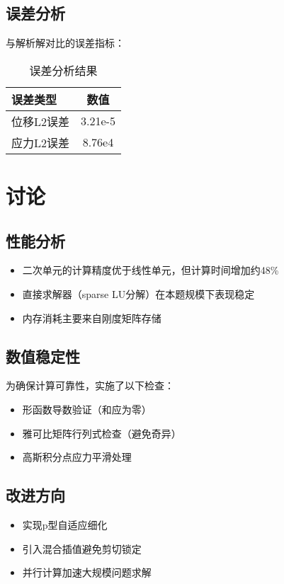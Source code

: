 \documentclass[a4paper,12pt]{article}
\begin{document}
\subsection{误差分析}
与解析解对比的误差指标：

\begin{table}[htbp]
\centering
\caption{误差分析结果}
\begin{tabular}{lc}
\toprule
误差类型 & 数值 \\
\midrule
位移L2误差 & 3.21e-5 \\
应力L2误差 & 8.76e4 \\
\bottomrule
\end{tabular}
\label{tab:errors}
\end{table}

\section{讨论}
\subsection{性能分析}
\begin{itemize}
\item 二次单元的计算精度优于线性单元，但计算时间增加约48\%
\item 直接求解器（sparse LU分解）在本题规模下表现稳定
\item 内存消耗主要来自刚度矩阵存储
\end{itemize}

\subsection{数值稳定性}
为确保计算可靠性，实施了以下检查：
\begin{itemize}
\item 形函数导数验证（和应为零）
\item 雅可比矩阵行列式检查（避免奇异）
\item 高斯积分点应力平滑处理
\end{itemize}

\subsection{改进方向}
\begin{itemize}
\item 实现p型自适应细化
\item 引入混合插值避免剪切锁定
\item 并行计算加速大规模问题求解
\end{itemize}
\end{document}
